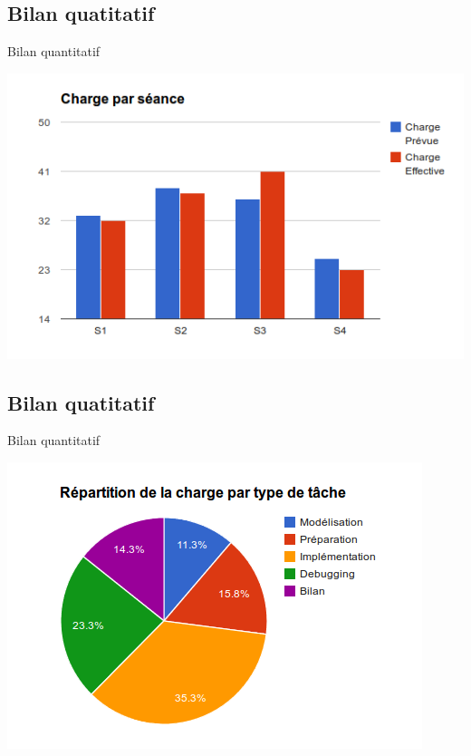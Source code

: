 \documentclass[aspectratio=169]{beamer}
\begin{document}
\subsection{Bilan quatitatif}
\begin{frame}{Bilan quantitatif}
\begin{center}
 \includegraphics[scale=0.5]{chargeseance}
\end{center} 
\end{frame}

\subsection{Bilan quatitatif}
\begin{frame}{Bilan quantitatif}
 \begin{center}
 \includegraphics[scale=0.5]{chargetype}
\end{center}
\end{frame}
\end{document}
